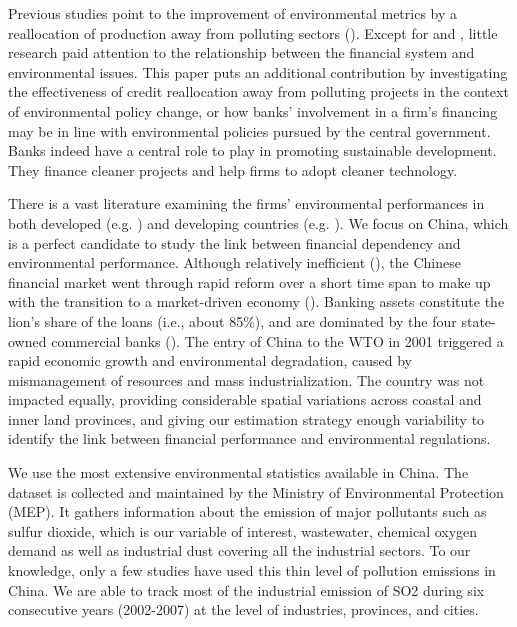 \documentclass[12pt]{article}
\begin{document}
Previous studies point to the improvement of environmental metrics by a reallocation of production away from polluting sectors (\cite{Shi2018-zk, Chen2018-ki, Hering2014-af}). Except for \cite{Andersen2015-pa, Andersen2017-wf} and \cite{Earnhart2012-pk}, little research paid attention to the relationship between the financial system and environmental issues. This paper puts an additional contribution by investigating the effectiveness of credit reallocation away from polluting projects in the context of environmental policy change, or how banks' involvement in a firm’s financing may be in line with environmental policies pursued by the central government. Banks indeed have a central role to play in promoting sustainable development. They finance cleaner projects and help firms to adopt cleaner technology.

There is a vast literature examining the firms' environmental performances in both developed (e.g. \cite{Gray1996-ht, Cole2005-ff, Shadbegian2005-bw, Earnhart2012-pk}) and developing countries (e.g. \cite{Earnhart2006-kb, Cole2008-pj}). We focus on China, which is a perfect candidate to study the link between financial dependency and environmental performance. Although relatively inefficient (\cite{Boyreau-Debray2003-vn, Dollar2007-dr}), the Chinese financial market went through rapid reform over a short time span to make up with the transition to a market-driven economy (\cite{Jarreau2014-lb}). Banking assets constitute the lion’s share of the loans (i.e., about 85\%), and are dominated by the four state-owned commercial banks (\cite{Allen2009-bs}). The entry of China to the WTO in 2001 triggered a rapid economic growth and environmental degradation, caused by mismanagement of resources and mass industrialization. The country was not impacted equally, providing considerable spatial variations across coastal and inner land provinces, and giving our estimation strategy enough variability to identify the link between financial performance and environmental regulations. 

We use the most extensive environmental statistics available in China. The dataset is collected and maintained by the Ministry of Environmental Protection (MEP). It gathers information about the emission of major pollutants such as sulfur dioxide, which is our variable of interest, wastewater, chemical oxygen demand as well as industrial dust covering all the industrial sectors. To our knowledge, only a few studies have used this thin level of pollution emissions in China. We are able to track most of the industrial emission of SO2 during six consecutive years (2002-2007) at the level of industries, provinces, and cities. 
\end{document}
